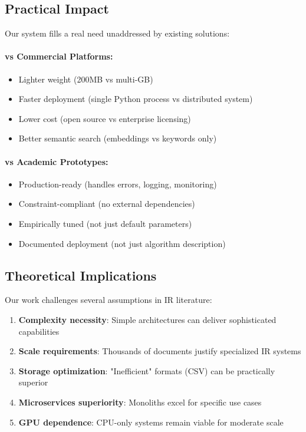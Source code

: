 \subsection{Practical Impact}

Our system fills a real need unaddressed by existing solutions:

\paragraph{vs Commercial Platforms:}
\begin{itemize}[leftmargin=*,itemsep=2pt,topsep=2pt]
 \item Lighter weight (200MB vs multi-GB)
 \item Faster deployment (single Python process vs distributed system)
 \item Lower cost (open source vs enterprise licensing)
 \item Better semantic search (embeddings vs keywords only)
\end{itemize}

\paragraph{vs Academic Prototypes:}
\begin{itemize}[leftmargin=*,itemsep=2pt,topsep=2pt]
 \item Production-ready (handles errors, logging, monitoring)
 \item Constraint-compliant (no external dependencies)
 \item Empirically tuned (not just default parameters)
 \item Documented deployment (not just algorithm description)
\end{itemize}

\subsection{Theoretical Implications}

Our work challenges several assumptions in IR literature:

\begin{enumerate}[leftmargin=*,itemsep=2pt,topsep=2pt]
 \item \textbf{Complexity necessity}: Simple architectures can deliver sophisticated capabilities
 \item \textbf{Scale requirements}: Thousands of documents justify specialized IR systems
 \item \textbf{Storage optimization}: "Inefficient" formats (CSV) can be practically superior
 \item \textbf{Microservices superiority}: Monoliths excel for specific use cases
 \item \textbf{GPU dependence}: CPU-only systems remain viable for moderate scale
\end{enumerate}


